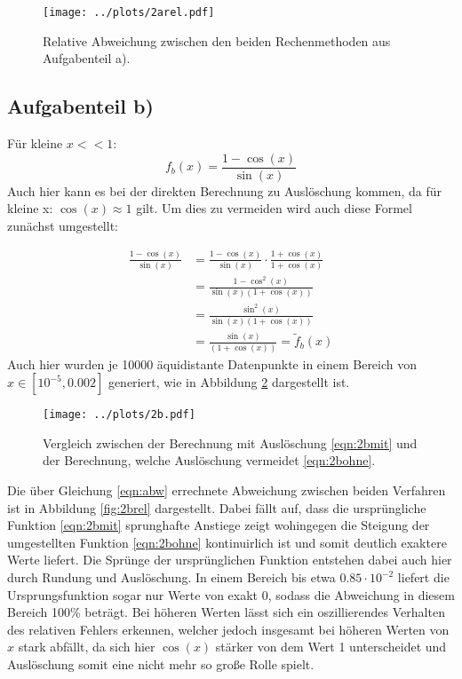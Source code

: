 \begin{figure}[H]
  \centering
  \texttt{[image: ../plots/2arel.pdf]}
  \caption{Relative Abweichung zwischen den beiden Rechenmethoden aus Aufgabenteil a).}
  \label{fig:2arel}
\end{figure}

\subsection*{Aufgabenteil b)}
Für kleine $x<<1$:
\begin{equation}
  f_b(x)=\frac{1-\cos(x)}{\sin(x)}
  \label{eqn:2bmit}
\end{equation}
Auch hier kann es bei der direkten Berechnung zu Auslöschung kommen, da für kleine x: $\cos(x)\approx 1$ gilt.
Um dies zu vermeiden wird auch diese Formel zunächst umgestellt:

\begin{align}
  \frac{1-\cos(x)}{\sin(x)} &= \frac{1-\cos(x)}{\sin(x)}\cdot \frac{1+\cos(x)}{1+\cos(x)}\\
  &=\frac{1-\cos^2(x)}{\sin(x)(1+\cos(x))} \\
  &=\frac{\sin^2(x)}{\sin(x)(1+\cos(x))} \\
  &=\frac{\sin(x)}{(1+\cos(x))} =\tilde{f}_b(x)
  \label{eqn:2bohne}
\end{align}
Auch hier wurden je 10000 äquidistante
Datenpunkte in einem Bereich von $x\in[10^{-5},0.002]$ generiert, wie in Abbildung \ref{fig:2b} dargestellt ist.

\begin{figure}[H]
  \centering
  \texttt{[image: ../plots/2b.pdf]}
  \caption{Vergleich zwischen der Berechnung mit Auslöschung \eqref{eqn:2bmit} und der Berechnung, welche Auslöschung vermeidet \eqref{eqn:2bohne}.}
  \label{fig:2b}
\end{figure}

Die über Gleichung \eqref{eqn:abw} errechnete Abweichung zwischen beiden Verfahren ist in Abbildung \ref{fig:2brel} dargestellt. Dabei fällt auf, dass die ursprüngliche Funktion \eqref{eqn:2bmit} sprunghafte Anstiege zeigt wohingegen die Steigung der umgestellten Funktion \eqref{eqn:2bohne} kontinuirlich ist und somit
deutlich exaktere Werte liefert. Die Sprünge der ursprünglichen Funktion entstehen dabei auch hier durch Rundung und Auslöschung. In einem Bereich bis etwa $0.85\cdot10^{-2}$ liefert die Ursprungsfunktion sogar nur Werte von exakt 0, sodass die Abweichung in diesem Bereich 100\% beträgt. Bei höheren Werten lässt sich ein oszillierendes
Verhalten des relativen Fehlers erkennen, welcher jedoch insgesamt bei höheren Werten von $x$ stark abfällt, da sich hier $\cos(x)$ stärker von dem Wert 1 unterscheidet und Auslöschung somit eine nicht mehr so große Rolle spielt.


